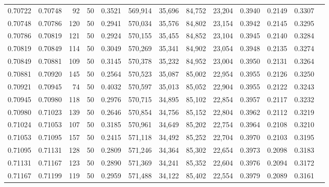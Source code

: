 \begin{tabular}{rrrrrrrrrrrrr}
0.70722 & 0.70748 &    92 &  50 &                                     0.3521 & 569,914 &  35,696 &  84,752 &  23,204 & 0.3940 & 0.2149 & 0.3307 \\
0.70748 & 0.70786 &   120 &  50 &                                     0.2941 & 570,034 &  35,576 &  84,802 &  23,154 & 0.3942 & 0.2145 & 0.3295 \\
0.70786 & 0.70819 &   121 &  50 &                                     0.2924 & 570,155 &  35,455 &  84,852 &  23,104 & 0.3945 & 0.2140 & 0.3284 \\
0.70819 & 0.70849 &   114 &  50 &                                     0.3049 & 570,269 &  35,341 &  84,902 &  23,054 & 0.3948 & 0.2135 & 0.3274 \\
0.70849 & 0.70881 &   109 &  50 &                                     0.3145 & 570,378 &  35,232 &  84,952 &  23,004 & 0.3950 & 0.2131 & 0.3264 \\
0.70881 & 0.70920 &   145 &  50 &                                     0.2564 & 570,523 &  35,087 &  85,002 &  22,954 & 0.3955 & 0.2126 & 0.3250 \\
0.70921 & 0.70945 &    74 &  50 &                                     0.4032 & 570,597 &  35,013 &  85,052 &  22,904 & 0.3955 & 0.2122 & 0.3243 \\
0.70945 & 0.70980 &   118 &  50 &                                     0.2976 & 570,715 &  34,895 &  85,102 &  22,854 & 0.3957 & 0.2117 & 0.3232 \\
0.70980 & 0.71023 &   139 &  50 &                                     0.2646 & 570,854 &  34,756 &  85,152 &  22,804 & 0.3962 & 0.2112 & 0.3219 \\
0.71024 & 0.71053 &   107 &  50 &                                     0.3185 & 570,961 &  34,649 &  85,202 &  22,754 & 0.3964 & 0.2108 & 0.3210 \\
0.71053 & 0.71095 &   157 &  50 &                                     0.2415 & 571,118 &  34,492 &  85,252 &  22,704 & 0.3970 & 0.2103 & 0.3195 \\
0.71095 & 0.71131 &   128 &  50 &                                     0.2809 & 571,246 &  34,364 &  85,302 &  22,654 & 0.3973 & 0.2098 & 0.3183 \\
0.71131 & 0.71167 &   123 &  50 &                                     0.2890 & 571,369 &  34,241 &  85,352 &  22,604 & 0.3976 & 0.2094 & 0.3172 \\
0.71167 & 0.71199 &   119 &  50 &                                     0.2959 & 571,488 &  34,122 &  85,402 &  22,554 & 0.3979 & 0.2089 & 0.3161 \\

\end{tabular}
